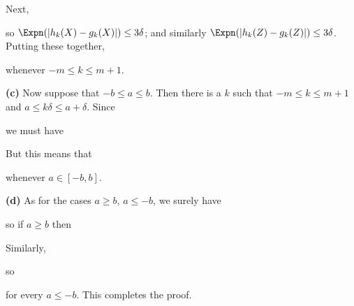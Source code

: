 {\noindent Next,




\noindent so $\Expn(|h_k(X)-g_k(X)|)\le 3\delta$;  and similarly
$\Expn(|h_k(Z)-g_k(Z)|)\le 3\delta$.   Putting these together,


\noindent whenever $-m\le k\le m+1$.

\medskip

{\bf (c)} Now suppose that $-b\le a\le b$.   Then there is a $k$ such
that $-m\le k\le m+1$ and $a\le k\delta\le a+\delta$.   Since


\noindent we must have



\noindent But this means that


\noindent whenever $a\in[-b,b]$.

\medskip

{\bf (d)} As for the cases $a\ge b$, $a\le -b$,
we surely have


\noindent so if $a\ge b$ then


\noindent Similarly,


\noindent so


\noindent  for every $a\le -b$.
This completes the proof.
}%

